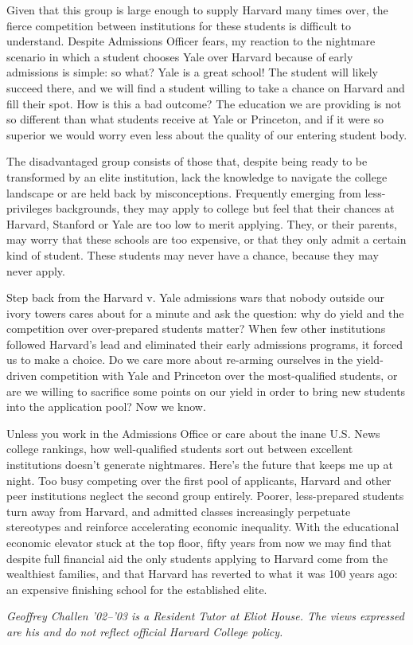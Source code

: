 Given that this group is large enough to supply Harvard many times over, the
fierce competition between institutions for these students is difficult to
understand. Despite Admissions Officer fears, my reaction to the nightmare
scenario in which a student chooses Yale over Harvard because of early
admissions is simple: so what? Yale is a great school! The student will
likely succeed there, and we will find a student willing to take a chance on
Harvard and fill their spot. How is this a bad outcome? The education we are
providing is not so different than what students receive at Yale or
Princeton, and if it were so superior we would worry even less about the
quality of our entering student body.

The disadvantaged group consists of those that, despite being ready to be
transformed by an elite institution, lack the knowledge to navigate the
college landscape or are held back by misconceptions. Frequently emerging
from less-privileges backgrounds, they may apply to college but feel that
their chances at Harvard, Stanford or Yale are too low to merit applying.
They, or their parents, may worry that these schools are too expensive, or
that they only admit a certain kind of student. These students may never have
a chance, because they may never apply.

Step back from the Harvard v. Yale admissions wars that nobody outside our
ivory towers cares about for a minute and ask the question: why do yield and
the competition over over-prepared students matter? When few other
institutions followed Harvard's lead and eliminated their early admissions
programs, it forced us to make a choice. Do we care more about re-arming
ourselves in the yield-driven competition with Yale and Princeton over the
most-qualified students, or are we willing to sacrifice some points on our
yield in order to bring new students into the application pool? Now we know.

Unless you work in the Admissions Office or care about the inane U.S. News
college rankings, how well-qualified students sort out between excellent
institutions doesn't generate nightmares. Here's the future that keeps me up
at night. Too busy competing over the first pool of applicants, Harvard and
other peer institutions neglect the second group entirely. Poorer,
less-prepared students turn away from Harvard, and admitted classes
increasingly perpetuate stereotypes and reinforce accelerating economic
inequality. With the educational economic elevator stuck at the top floor,
fifty years from now we may find that despite full financial aid the only
students applying to Harvard come from the wealthiest families, and that
Harvard has reverted to what it was 100 years ago: an expensive finishing
school for the established elite.


\textit{Geoffrey Challen '02--'03 is a Resident Tutor at Eliot House. The
views expressed are his and do not reflect official Harvard College policy.}

